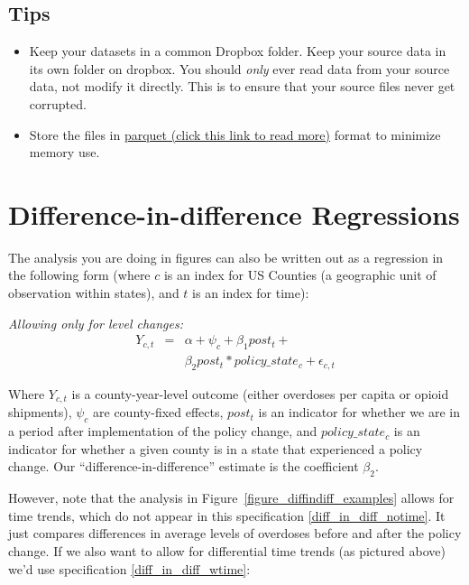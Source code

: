 \documentclass[12pt]{article}
\begin{document}
\subsection*{Tips}
\begin{itemize}
  \item Keep your datasets in a common Dropbox folder. Keep your source data in its own folder on dropbox. You should \emph{only} ever read data from your source data, not modify it directly. This is to ensure that your source files never get corrupted.
  \item Store the files in \href{https://www.practicaldatascience.org/notebooks/PDS_not_yet_in_coursera/30_big_data/30_parquet.html}{parquet (click this link to read more)} format to minimize memory use.
\end{itemize}

\appendix

\section{Difference-in-difference Regressions}\label{appendix_diffindiff}

The analysis you are doing in figures can also be written out as a regression in the following form (where $c$ is an index for US Counties (a geographic unit of observation within states), and $t$ is an index for time):

\emph{Allowing only for level changes:}
\begin{eqnarray}
 Y_{c,t} &=& \alpha + \psi_{c} + \beta_1 post_{t} + \label{diff_in_diff_notime}\\
  && \beta_2 post_{t} * policy\_state_{c} + \epsilon_{c,t} \nonumber
\end{eqnarray}

Where $Y_{c,t}$ is a county-year-level outcome (either overdoses per capita or opioid shipments),  $\psi_c$ are county-fixed effects, $post_{t}$ is an indicator for whether we are in a period after implementation of the policy change, and $policy\_state_{c}$ is an indicator for whether a given county is in a state that experienced a policy change. Our ``difference-in-difference'' estimate is the coefficient $\beta_2$.

However, note that the analysis in Figure~\ref{figure_diffindiff_examples} allows for time trends, which do not appear in this specification \ref{diff_in_diff_notime}. It just compares differences in average levels of overdoses before and after the policy change. If we also want to allow for differential time trends (as pictured above) we'd use specification \ref{diff_in_diff_wtime}:
\end{document}
